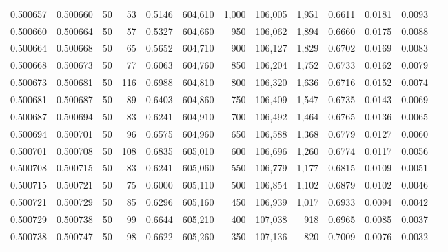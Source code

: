 \begin{tabular}{rrrrrrrrrrrrr}
0.500657 & 0.500660 &    50 &  53 &                                     0.5146 & 604,610 &   1,000 & 106,005 &   1,951 & 0.6611 & 0.0181 & 0.0093 \\
0.500660 & 0.500664 &    50 &  57 &                                     0.5327 & 604,660 &     950 & 106,062 &   1,894 & 0.6660 & 0.0175 & 0.0088 \\
0.500664 & 0.500668 &    50 &  65 &                                     0.5652 & 604,710 &     900 & 106,127 &   1,829 & 0.6702 & 0.0169 & 0.0083 \\
0.500668 & 0.500673 &    50 &  77 &                                     0.6063 & 604,760 &     850 & 106,204 &   1,752 & 0.6733 & 0.0162 & 0.0079 \\
0.500673 & 0.500681 &    50 & 116 &                                     0.6988 & 604,810 &     800 & 106,320 &   1,636 & 0.6716 & 0.0152 & 0.0074 \\
0.500681 & 0.500687 &    50 &  89 &                                     0.6403 & 604,860 &     750 & 106,409 &   1,547 & 0.6735 & 0.0143 & 0.0069 \\
0.500687 & 0.500694 &    50 &  83 &                                     0.6241 & 604,910 &     700 & 106,492 &   1,464 & 0.6765 & 0.0136 & 0.0065 \\
0.500694 & 0.500701 &    50 &  96 &                                     0.6575 & 604,960 &     650 & 106,588 &   1,368 & 0.6779 & 0.0127 & 0.0060 \\
0.500701 & 0.500708 &    50 & 108 &                                     0.6835 & 605,010 &     600 & 106,696 &   1,260 & 0.6774 & 0.0117 & 0.0056 \\
0.500708 & 0.500715 &    50 &  83 &                                     0.6241 & 605,060 &     550 & 106,779 &   1,177 & 0.6815 & 0.0109 & 0.0051 \\
0.500715 & 0.500721 &    50 &  75 &                                     0.6000 & 605,110 &     500 & 106,854 &   1,102 & 0.6879 & 0.0102 & 0.0046 \\
0.500721 & 0.500729 &    50 &  85 &                                     0.6296 & 605,160 &     450 & 106,939 &   1,017 & 0.6933 & 0.0094 & 0.0042 \\
0.500729 & 0.500738 &    50 &  99 &                                     0.6644 & 605,210 &     400 & 107,038 &     918 & 0.6965 & 0.0085 & 0.0037 \\
0.500738 & 0.500747 &    50 &  98 &                                     0.6622 & 605,260 &     350 & 107,136 &     820 & 0.7009 & 0.0076 & 0.0032 \\

\end{tabular}
